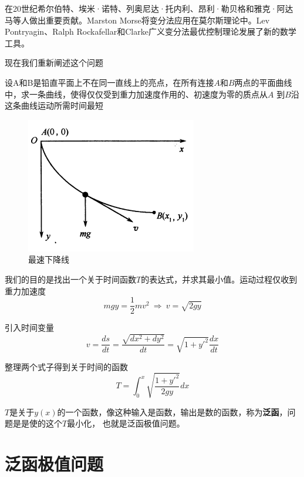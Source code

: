 在20世纪希尔伯特、埃米·诺特、列奥尼达·托内利、昂利·勒贝格和雅克·阿达马等人做出重要贡献。Marston Morse将变分法应用在莫尔斯理论中。Lev Pontryagin、Ralph Rockafellar和Clarke广义变分法最优控制理论发展了新的数学工具。

现在我们重新阐述这个问题
\begin{framed}
    \begin{question}
        设A和B是铅直平面上不在同一直线上的亮点，在所有连接$A$和$B$两点的平面曲线中，求一条曲线，使得仅仅受到重力加速度作用的、初速度为零的质点从$A$
            到$B$沿这条曲线运动所需时间最短
    \end{question}
\end{framed}

\begin{figure}[H]
    \centering
    \includegraphics[scale=0.6]{figures/chapter3/最速下降线.png}
    \caption{最速下降线}
\end{figure}

我们的目的是找出一个关于时间函数$T$的表达式，并求其最小值。运动过程仅收到重力加速度
\begin{equation}
    mgy=\frac{1}{2}mv^2\ \Rightarrow\ v=\sqrt{2gy}
\end{equation}

引入时间变量
\begin{equation}
    v=\frac{ds}{dt}=\frac{\sqrt{dx^2+dy^2}}{dt}=\sqrt{1+y'^2}\frac{dx}{dt}
\end{equation}

整理两个式子得到关于时间的函数
\begin{equation}
    T=\int_{0}^{x}\sqrt{\frac{1+y'^2}{2gy}}dx
\end{equation}

$T$是关于$y(x)$的一个函数，像这种输入是函数，输出是数的函数，称为\textbf{泛函}，问题是是使的这个$T$最小化，
也就是泛函极值问题。

\section{泛函极值问题}

